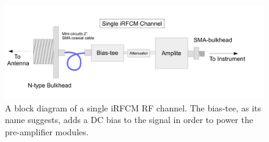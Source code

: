 \begin{figure}
\centering
	\includegraphics[width=\textwidth]{figures/IRFCM}
	\caption{A block diagram of a single iRFCM RF channel.  The bias-tee, as its name suggests, adds a DC bias to the signal in order to power the pre-amplifier modules.}
	\label{fig:IRFCM}
\end{figure}
	
